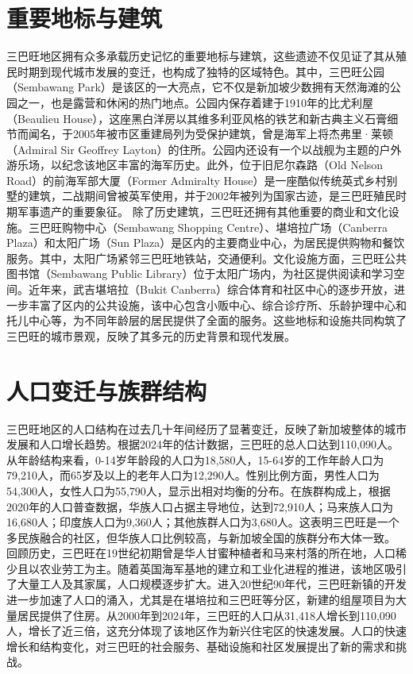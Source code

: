 \documentclass[11pt,a4paper,twoside,openany]{book}
\begin{document}
\section{重要地标与建筑}
三巴旺地区拥有众多承载历史记忆的重要地标与建筑，这些遗迹不仅见证了其从殖民时期到现代城市发展的变迁，也构成了独特的区域特色。其中，三巴旺公园（Sembawang Park）是该区的一大亮点，它不仅是新加坡少数拥有天然海滩的公园之一，也是露营和休闲的热门地点。公园内保存着建于1910年的比尤利屋（Beaulieu House），这座黑白洋房以其维多利亚风格的铁艺和新古典主义石膏细节而闻名，于2005年被市区重建局列为受保护建筑，曾是海军上将杰弗里·莱顿（Admiral Sir Geoffrey Layton）的住所。公园内还设有一个以战舰为主题的户外游乐场，以纪念该地区丰富的海军历史。此外，位于旧尼尔森路（Old Nelson Road）的前海军部大厦（Former Admiralty House）是一座酷似传统英式乡村别墅的建筑，二战期间曾被英军使用，并于2002年被列为国家古迹，是三巴旺殖民时期军事遗产的重要象征。
除了历史建筑，三巴旺还拥有其他重要的商业和文化设施。三巴旺购物中心（Sembawang Shopping Centre）、堪培拉广场（Canberra Plaza）和太阳广场（Sun Plaza）是区内的主要商业中心，为居民提供购物和餐饮服务。其中，太阳广场紧邻三巴旺地铁站，交通便利。文化设施方面，三巴旺公共图书馆（Sembawang Public Library）位于太阳广场内，为社区提供阅读和学习空间。近年来，武吉堪培拉（Bukit Canberra）综合体育和社区中心的逐步开放，进一步丰富了区内的公共设施，该中心包含小贩中心、综合诊疗所、乐龄护理中心和托儿中心等，为不同年龄层的居民提供了全面的服务。这些地标和设施共同构筑了三巴旺的城市景观，反映了其多元的历史背景和现代发展。

\section{人口变迁与族群结构}
三巴旺地区的人口结构在过去几十年间经历了显著变迁，反映了新加坡整体的城市发展和人口增长趋势。根据2024年的估计数据，三巴旺的总人口达到110,090人。从年龄结构来看，0-14岁年龄段的人口为18,580人，15-64岁的工作年龄人口为79,210人，而65岁及以上的老年人口为12,290人。性别比例方面，男性人口为54,300人，女性人口为55,790人，显示出相对均衡的分布。在族群构成上，根据2020年的人口普查数据，华族人口占据主导地位，达到72,910人；马来族人口为16,680人；印度族人口为9,360人；其他族群人口为3,680人。这表明三巴旺是一个多民族融合的社区，但华族人口比例较高，与新加坡全国的族群分布大体一致。
回顾历史，三巴旺在19世纪初期曾是华人甘蜜种植者和马来村落的所在地，人口稀少且以农业劳工为主。随着英国海军基地的建立和工业化进程的推进，该地区吸引了大量工人及其家属，人口规模逐步扩大。进入20世纪90年代，三巴旺新镇的开发进一步加速了人口的涌入，尤其是在堪培拉和三巴旺等分区，新建的组屋项目为大量居民提供了住房。从2000年到2024年，三巴旺的人口从31,418人增长到110,090人，增长了近三倍，这充分体现了该地区作为新兴住宅区的快速发展。人口的快速增长和结构变化，对三巴旺的社会服务、基础设施和社区发展提出了新的需求和挑战。
\end{document}
